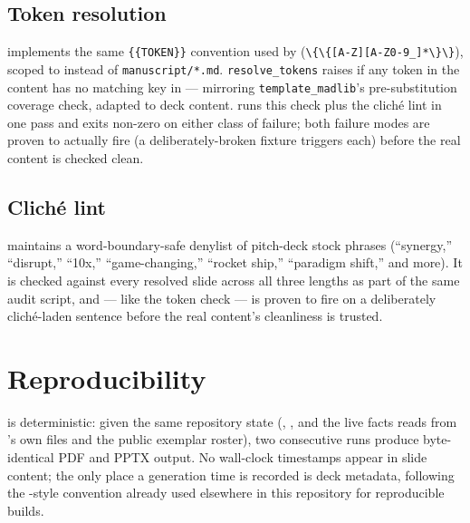 \documentclass[
]{article}
\begin{document}
\subsection{Token resolution}\label{token-resolution}

 implements the same
\texttt{\{\{TOKEN\}\}} convention used by
(\texttt{\textbackslash{}\{\textbackslash{}\{{[}A-Z{]}{[}A-Z0-9\_{]}*\textbackslash{}\}\textbackslash{}\}}),
scoped to  instead of
\texttt{manuscript/*.md}. \texttt{resolve\_tokens} raises if any token
in the content has no matching key in
 --- mirroring
\texttt{template\_madlib}'s
 pre-substitution
coverage check, adapted to deck content.
 runs this check plus the cliché
lint in one pass and exits non-zero on either class of failure; both
failure modes are proven to actually fire (a deliberately-broken fixture
triggers each) before the real content is checked clean.

\subsection{Cliché lint}\label{clichuxe9-lint}

 maintains a word-boundary-safe denylist of
pitch-deck stock phrases (``synergy,'' ``disrupt,'' ``10x,''
``game-changing,'' ``rocket ship,'' ``paradigm shift,'' and more). It is
checked against every resolved slide across all three lengths as part of
the same audit script, and --- like the token check --- is proven to
fire on a deliberately cliché-laden sentence before the real content's
cleanliness is trusted.

\newpage

\section{Reproducibility}\label{sec:reproducibility}

 is deterministic: given the same
repository state (,
, and the live facts
 reads from 's
own files and the public exemplar roster), two consecutive runs produce
byte-identical PDF and PPTX output. No wall-clock timestamps appear in
slide content; the only place a generation time is recorded is deck
metadata, following the -style
convention already used elsewhere in this repository for reproducible
builds.
\end{document}
